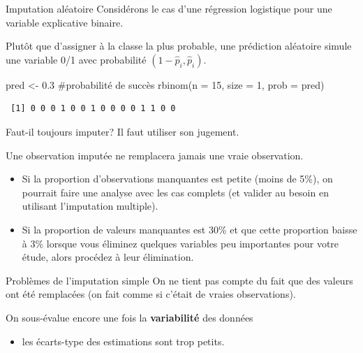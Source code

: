 \documentclass[
  ignorenonframetext,
]{beamer}
\newenvironment{Shaded}{\begin{snugshade}}{\end{snugshade}}
\newcommand{\AttributeTok}[1]{\textcolor[rgb]{0.40,0.45,0.13}{#1}}
\newcommand{\CommentTok}[1]{\textcolor[rgb]{0.37,0.37,0.37}{#1}}
\newcommand{\DecValTok}[1]{\textcolor[rgb]{0.68,0.00,0.00}{#1}}
\newcommand{\FloatTok}[1]{\textcolor[rgb]{0.68,0.00,0.00}{#1}}
\newcommand{\FunctionTok}[1]{\textcolor[rgb]{0.28,0.35,0.67}{#1}}
\newcommand{\NormalTok}[1]{\textcolor[rgb]{0.00,0.23,0.31}{#1}}
\newcommand{\OtherTok}[1]{\textcolor[rgb]{0.00,0.23,0.31}{#1}}
\providecommand{\tightlist}{%
  \setlength{\itemsep}{0pt}\setlength{\parskip}{0pt}}\usepackage{longtable,booktabs,array}
\begin{document}
\begin{frame}[fragile]{Imputation aléatoire}
\protect\hypertarget{imputation-aluxe9atoire}{}
Considérons le cas d'une régression logistique pour une variable
explicative binaire.

Plutôt que d'assigner à la classe la plus probable, une prédiction
aléatoire simule une variable 0/1 avec probabilité
\((1-\widehat{p}_i, \widehat{p}_i)\).

\begin{Shaded}
\begin{Highlighting}[numbers=left,,]
\NormalTok{pred }\OtherTok{\textless{}{-}} \FloatTok{0.3} \CommentTok{\#probabilité de succès}
\FunctionTok{rbinom}\NormalTok{(}\AttributeTok{n =} \DecValTok{15}\NormalTok{, }\AttributeTok{size =} \DecValTok{1}\NormalTok{, }\AttributeTok{prob =}\NormalTok{ pred)}
\end{Highlighting}
\end{Shaded}

\begin{verbatim}
 [1] 0 0 0 1 0 0 1 0 0 0 0 1 1 0 0
\end{verbatim}
\end{frame}

\begin{frame}{Faut-il toujours imputer?}
\protect\hypertarget{faut-il-toujours-imputer}{}
Il faut utiliser son jugement.

Une observation imputée ne remplacera jamais une vraie observation.

\begin{itemize}
\tightlist
\item
  Si la proportion d'observations manquantes est petite (moins de 5\%),
  on pourrait faire une analyse avec les cas complets (et valider au
  besoin en utilisant l'imputation multiple).
\item
  Si la proportion de valeurs manquantes est 30\% et que cette
  proportion baisse à 3\% lorsque vous éliminez quelques variables peu
  importantes pour votre étude, alors procédez à leur élimination.
\end{itemize}
\end{frame}

\begin{frame}{Problèmes de l'imputation simple}
\protect\hypertarget{probluxe8mes-de-limputation-simple}{}
On ne tient pas compte du fait que des valeurs ont été remplacées (on
fait comme si c'était de vraies observations).

On sous-évalue encore une fois la \textbf{variabilité} des données

\begin{itemize}
\tightlist
\item
  les écarts-type des estimations sont trop petits.
\end{itemize}
\end{frame}
\end{document}
